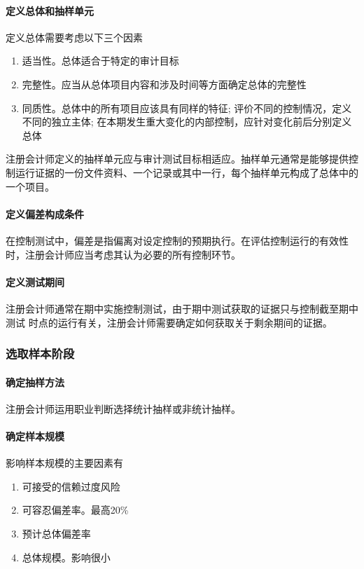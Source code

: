 \documentclass[UTF8,12pt]{ctexart}
\numberwithin{equation}{section} %
\numberwithin{figure}{section}
\numberwithin{table}{section}
\begin{document}
	\paragraph{定义总体和抽样单元}
	定义总体需要考虑以下三个因素
	\begin{enumerate}
		\item 适当性。总体适合于特定的审计目标
		
		\item 完整性。应当从总体项目内容和涉及时间等方面确定总体的完整性
		
		\item 同质性。总体中的所有项目应该具有同样的特征; 评价不同的控制情况，定义不同的独立主体; 在本期发生重大变化的内部控制，应针对变化前后分别定义总体
	\end{enumerate}
	
	注册会计师定义的抽样单元应与审计测试目标相适应。抽样单元通常是能够提供控制运行证据的一份文件资料、一个记录或其中一行，每个抽样单元构成了总体中的一个项目。
	
	\paragraph{定义偏差构成条件} 在控制测试中，偏差是指偏离对设定控制的预期执行。在评估控制运行的有效性时，注册会计师应当考虑其认为必要的所有控制环节。
	
	\paragraph{定义测试期间} 注册会计师通常在期中实施控制测试，由于期中测试获取的证据只与控制截至期中测试 时点的运行有关，注册会计师需要确定如何获取关于剩余期间的证据。
	
	\subsubsection{选取样本阶段}
	\paragraph{确定抽样方法} 注册会计师运用职业判断选择统计抽样或非统计抽样。
	
	\paragraph{确定样本规模} 影响样本规模的主要因素有
	\begin{enumerate}
		\item 可接受的信赖过度风险
		
		\item 可容忍偏差率。最高20\%
		
		\item 预计总体偏差率
		
		\item 总体规模。影响很小
	\end{enumerate}
	
\end{document}
